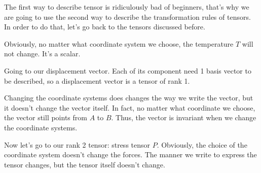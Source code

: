 \documentclass[UTF8]{ctexart}
\theoremstyle{definition}
\theoremstyle{remark}
\begin{document}
The first way to describe tensor is ridiculously bad of beginners, that's why we are going to use the second way to describe the transformation rules of tensors.
In order to do that, let's go back to the tensors discussed before.

Obviously, no matter what coordinate system we choose, the temperature $T$ will not change. It's a scalar.

Going to our displacement vector. Each of its component need 1 basis vector to be described, so a displacement vector is a tensor of rank 1.


Changing the coordinate systems does changes the way we write the vector, but it doesn't change the vector itself. In fact, no matter what coordinate we choose, the vector still points from $A$ to $B$. Thus, the vector is invariant when we change the coordinate systems.

Now let's go to our rank 2 tensor: stress tensor $P$. Obviously, the choice of the coordinate system doesn't change the forces. The manner we write to express the tensor changes, but the tensor itself doesn't change.
\end{document}

